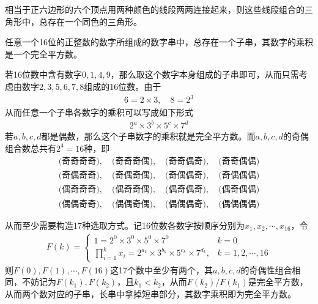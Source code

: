 \hints 相当于正六边形的六个顶点用两种颜色的线段两两连接起来，则这些线段组合的三角形中，总存在一个同色的三角形。

\begin{question}
  任意一个16位的正整数的数字所组成的数字串中，总存在一个子串，其数字的乘积是一个完全平方数。
\end{question}

\hints 若16位数中含有数字$0,1,4,9$，那么取这个数字本身组成的子串即可，从而只需考虑由数字$2,3,5,6,7,8$组成的16位数。由于
\begin{align*}
  6 = 2\times 3,\quad 8=2^3
\end{align*}
从而任意一个子串各数字的乘积可以写成如下形式
\begin{align*}
  2^a \times 3^b \times 5^c \times 7^d
\end{align*}
若$a,b,c,d$都是偶数，那么这个子串数字的乘积就是完全平方数。而$a,b,c,d$的奇偶组合数总共有$2^4=16$种，即
\begin{align*}
  \text{(奇奇奇奇)},\quad \text{(奇奇奇偶)},\quad \text{(奇奇偶奇)},\quad \text{(奇奇偶偶)}\\
  \text{(奇偶奇奇)},\quad \text{(奇偶奇偶)},\quad \text{(奇偶偶奇)},\quad \text{(奇偶偶偶)}\\
  \text{(偶奇奇奇)},\quad \text{(偶奇奇偶)},\quad \text{(偶奇偶奇)},\quad \text{(偶奇偶偶)}\\
  \text{(偶偶奇奇)},\quad \text{(偶偶奇偶)},\quad \text{(偶偶偶奇)},\quad \text{(偶偶偶偶)}
\end{align*}

从而至少需要构造17种选取方式。记16位数各数字按顺序分别为$x_1,x_2,\cdots,x_{16}$，令
\begin{align*}
  F(k) =
  \begin{cases}
    1 = 2^0 \times 3^0 \times 5^0 \times 7^0 & k=0\\
    \prod_{i=1}^k x_i = 2^{a_k} \times 3^{b_k} \times 5^{c_k} \times 7^{d_k},&k=1,2,\cdots,16
  \end{cases}
\end{align*}
则$F(0),F(1),\cdots,F(16)$这17个数中至少有两个，其$a,b,c,d$的奇偶性组合相同，不妨记为$F(k_1),F(k_2)$，且$k_1<k_2$，从而$F(k_2)/F(k_1)$是完全平方数，从而两个数对应的子串，长串中拿掉短串部分，其数字乘积即为完全平方数。
